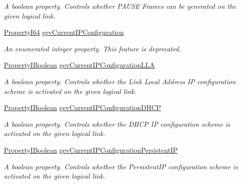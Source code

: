 \begin{DoxyCompactItemize}
\begin{DoxyCompactList}\small\item\em A boolean property. Controls whether P\+A\+U\+S\+E Frames can be generated on the given logical link. \end{DoxyCompactList}\item 
\hyperlink{group___common_interface_ga81749b2696755513663492664a18a893}{Property\+I64} \hyperlink{classmv_i_m_p_a_c_t_1_1acquire_1_1_gen_i_cam_1_1_transport_layer_control_aca1945229a6695d6c1c6a82549ef1f4c}{gev\+Current\+I\+P\+Configuration}
\begin{DoxyCompactList}\small\item\em An enumerated integer property. This feature is deprecated. \end{DoxyCompactList}\item 
\hyperlink{group___common_interface_ga44f9437e24b21b6c93da9039ec6786aa}{Property\+I\+Boolean} \hyperlink{classmv_i_m_p_a_c_t_1_1acquire_1_1_gen_i_cam_1_1_transport_layer_control_a4303c3b2abd4b7a4f2ef1377666affb8}{gev\+Current\+I\+P\+Configuration\+L\+L\+A}
\begin{DoxyCompactList}\small\item\em A boolean property. Controls whether the Link Local Address I\+P configuration scheme is activated on the given logical link. \end{DoxyCompactList}\item 
\hyperlink{group___common_interface_ga44f9437e24b21b6c93da9039ec6786aa}{Property\+I\+Boolean} \hyperlink{classmv_i_m_p_a_c_t_1_1acquire_1_1_gen_i_cam_1_1_transport_layer_control_a0c4ccf260567a6cec39600933ba36a81}{gev\+Current\+I\+P\+Configuration\+D\+H\+C\+P}
\begin{DoxyCompactList}\small\item\em A boolean property. Controls whether the D\+H\+C\+P I\+P configuration scheme is activated on the given logical link. \end{DoxyCompactList}\item 
\hyperlink{group___common_interface_ga44f9437e24b21b6c93da9039ec6786aa}{Property\+I\+Boolean} \hyperlink{classmv_i_m_p_a_c_t_1_1acquire_1_1_gen_i_cam_1_1_transport_layer_control_a20703ebd24b5979f0700526c85ab9422}{gev\+Current\+I\+P\+Configuration\+Persistent\+I\+P}
\begin{DoxyCompactList}\small\item\em A boolean property. Controls whether the Persistent\+I\+P configuration scheme is activated on the given logical link. \end{DoxyCompactList}\item 

\end{DoxyCompactItemize}
